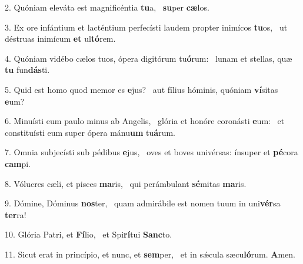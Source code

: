 2. Quóniam eleváta est magnificéntia \textbf{tu}a, \ast\  \textbf{su}per \textbf{cæ}los.\

3. Ex ore infántium et lacténtium perfecísti laudem propter inimícos \textbf{tu}os, \ast\  ut déstruas inimícum \textbf{et} ul\textbf{tó}rem.\

4. Quóniam vidébo cælos tuos, ópera digitórum tu\textbf{ó}rum: \ast\  lunam et stellas, quæ \textbf{tu} fun\textbf{dás}ti.\

5. Quid est homo quod memor es \textbf{e}jus? \ast\  aut fílius hóminis, quóniam \textbf{ví}sitas \textbf{e}um?\

6. Minuísti eum paulo minus ab Angelis, \dag\  glória et honóre coronásti \textbf{e}um: \ast\  et constituísti eum super ópera mánu\textbf{um} tu\textbf{á}rum.\

7. Omnia subjecísti sub pédibus \textbf{e}jus, \ast\  oves et boves univérsas: ínsuper et \textbf{pé}cora \textbf{cam}pi.\

8. Vólucres cæli, et pisces \textbf{ma}ris, \ast\  qui perámbulant \textbf{sé}mitas \textbf{ma}ris.\

9. Dómine, Dóminus \textbf{nos}ter, \ast\  quam admirábile est nomen tuum in uni\textbf{vér}sa \textbf{ter}ra!\

10. Glória Patri, et \textbf{Fí}lio, \ast\  et Spi\textbf{rí}tui \textbf{Sanc}to.\

11. Sicut erat in princípio, et nunc, et \textbf{sem}per, \ast\  et in sǽcula sæcu\textbf{ló}rum. \textbf{A}men.\

